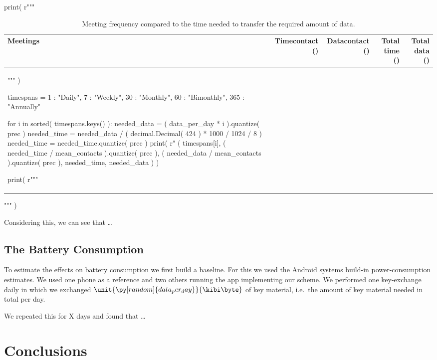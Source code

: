 \begin{table}
  \centering
  \caption{%
    Meeting frequency compared to the time needed to transfer the required 
    amount of data.
  }
  \label{tbl:MeetingsTradeoff}
  \begin{pycode}[random]
print( r"""
\begin{tabular}{lrrrr}
  Meetings &
  Time\per contact (\second) &
  Data\per contact (\kibi\byte) &
  Total time (\second) &
  Total data (\kibi\byte) \\
  \toprule
""" )

timespans = {
  1 : "Daily",
  7 : "Weekly",
  30 : "Monthly",
  60 : "Bimonthly",
  365 : "Annually"
}

for i in sorted( timespans.keys() ):
  needed_data = ( data_per_day * i ).quantize( prec )
  needed_time = needed_data / ( decimal.Decimal( 424 ) * 1000 / 1024 / 8 )
  needed_time = needed_time.quantize( prec )
  print( r"%
  ( timespans[i],
    ( needed_time / mean_contacts ).quantize( prec ),
    ( needed_data / mean_contacts ).quantize( prec ),
    needed_time,
    needed_data
    ) )

print( r"""
  \bottomrule
\end{tabular}
""" )
  \end{pycode}
\end{table}

Considering this, we can see that \dots

\subsection{The Battery Consumption}
\label{sec:Battery}
To estimate the effects on battery consumption we first build a baseline.
For this we used the Android systems build-in power-consumption estimates.
We used one phone as a reference and two others running the app implementing 
our scheme.
We performed one key-exchange daily in which we exchanged 
\(\unit{\py[random]{data_per_day}}{\kibi\byte}\) of key material, i.e.~the 
amount of key material needed in total per day.

We repeated this for X days and found that \dots


\section{Conclusions}
\label{sec:Conclusions}

